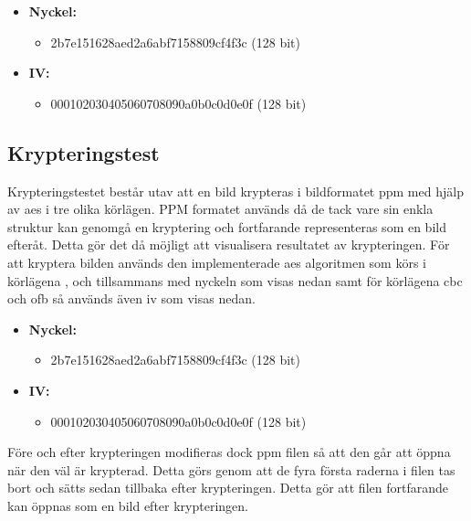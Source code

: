 \begin{itemize}
    \item []\textbf{Nyckel:}
    \begin{itemize}
        \item 2b7e151628aed2a6abf7158809cf4f3c (128 bit)
    \end{itemize}
    \item []\textbf{IV:}
    \begin{itemize}
        \item 000102030405060708090a0b0c0d0e0f (128 bit)
    \end{itemize}
\end{itemize}

\subsection{Krypteringstest} %
\label{sec:krypterings-test}
Krypteringstestet består utav att en bild krypteras i bildformatet \gls{ppm} med hjälp av \acrshort{aes} i tre olika körlägen.
PPM formatet används då de tack vare sin enkla struktur kan genomgå en kryptering och fortfarande representeras som en bild
efteråt. Detta gör det då möjligt att visualisera resultatet av krypteringen. För att kryptera bilden används den implementerade
\acrshort{aes} algoritmen som körs i körlägena ,  och  tillsammans med nyckeln som visas nedan samt
för körlägena \acrshort{cbc} och \acrshort{ofb} så används även \acrshort{iv} som visas nedan.

\begin{itemize}
    \item []\textbf{Nyckel:}
    \begin{itemize}
        \item 2b7e151628aed2a6abf7158809cf4f3c (128 bit)
    \end{itemize}
    \item []\textbf{IV:}
    \begin{itemize}
        \item 000102030405060708090a0b0c0d0e0f (128 bit)
    \end{itemize}
\end{itemize}

Före och efter krypteringen modifieras dock \gls{ppm} filen så att den går att öppna när den väl är krypterad. Detta görs genom att de fyra
första raderna i filen tas bort och sätts sedan tillbaka efter krypteringen. Detta gör att filen fortfarande kan öppnas som en bild
efter krypteringen.


